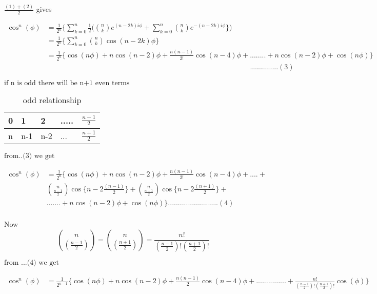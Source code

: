 \documentclass[fleqn]{article}
\begin{document}
\vspace{1 cm}

$\frac{(1)+(2)}{2}$ gives

\begin{align*}
\cos^{n}(\phi) &= \frac{1}{2^{n}}\{\sum_{k=0}^{n}\frac{1}{2}\bigg(\binom{n}{k}e^{(n-2k)i\phi}+\sum_{k=0}^{n}\binom{n}{k}e^{-(n-2k)i\phi}\}\bigg)\\
			   &=\frac{1}{2^{n}}\{\sum_{k=0}^{n}\binom{n}{k}\cos(n-2k)\phi\}\\
			   &=\frac{1}{2^{n}}\{\cos(n\phi)+n\cos(n-2)\phi+ \frac{n(n-1)}{2!}\cos(n-4)\phi+........+n\cos(n-2)\phi+\cos(n\phi)\}\\
			   & \hspace{340pt}..............(3)
\end{align*}

$\text{if n is odd there will be n+1 even terms}$

\begin{table}[hbtp]
\caption{odd relationship}
\begin{center}
\begin{tabular}{|l|l|l|l|l|}

\hline
0 & 1 & 2 &..... &$\frac{n-1}{2}$\\
\hline
n & n-1 & n-2 &...&$\frac{n+1}{2}$\\
\hline

\end{tabular}
\end{center}
\end{table}

$\text{from..(3) we get}$

\begin{align*}
\cos^{n}(\phi) &= \frac{1}{2^{n}}\{\cos(n\phi)+n\cos(n-2)\phi+\frac{n(n-1)}{2!}\cos(n-4)\phi+....+\\
			   & \binom{n}{\frac{n-1}{2}}\cos\{n-2\frac{(n-1)}{2}\}+ \binom{n}{\frac{n+1}{2}}\cos\{n-2\frac{(n+1)}{2}\}+\\
			   &.......+n\cos(n-2)\phi+\cos(n\phi)\}.........................(4)\\	   
\end{align*}

Now $$\binom{n}{(\frac{n-1}{2})} = \binom{n}{(\frac{n+1}{2})}=\frac{n!}{(\frac{n-1}{2})!(\frac{n+1}{2})!}$$

$\text{from ...(4) we get}$

\begin{align*}
\cos^{n}(\phi) &= \frac{1}{2^{n-1}} \{\cos(n\phi)+n\cos(n-2)\phi+\frac{n(n-1)}{2}\cos(n-4)\phi+...............+\frac{n!}{(\frac{n-1}{2})!(\frac{n+1}{2})!}\cos(\phi)\}\\
\end{align*}
\end{document}
